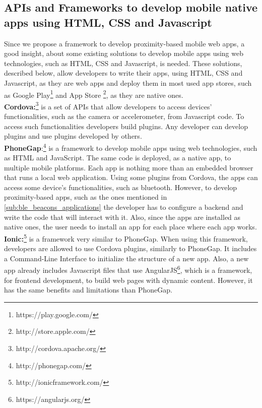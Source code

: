\subsection{APIs and Frameworks to develop mobile native apps 
using HTML, CSS and Javascript}
\label{sub:frameworks_web}
Since we propose a framework to develop proximity-based
mobile web apps, a good insight, about some existing
solutions to develop mobile apps using web technologies,
such as HTML, CSS and Javascript, is needed.
These solutions, described below, allow developers to
write their apps, using HTML, CSS and Javascript, as
they are web apps and deploy them in most used app
stores, such as 
Google Play\footnote{https://play.google.com/}
and
App Store \footnote{http://store.apple.com/},
as they are native ones.
\\
\textbf{Cordova:}\footnote{http://cordova.apache.org/}
is a set of APIs that allow developers to access
devices' functionalities, such as the camera or
accelerometer, from Javascript code.
To access such functionalities developers build plugins.
Any developer can develop plugins and use plugins
developed by others.
\\
\textbf{PhoneGap}:\footnote{http://phonegap.com/}
is a framework to develop mobile apps
using web technologies, such as HTML and JavaScript. The
same code is deployed, as a native app, to multiple mobile
platforms. Each app is nothing more than an embedded browser
that runs a local web application. 
Using some plugins from Cordova, the apps can access some
device's functionalities, such as bluetooth. 
However, to develop proximity-based apps, such as
the ones mentioned in 
\ref{sub:ble_beacons_applications}
the developer has to configure a backend and write the
code that will interact with it. Also, since the apps are
installed as native ones, the user needs to install
an app for each place where each app works.
\\
\textbf{Ionic:}\footnote{http://ionicframework.com/}
is a framework very similar to PhoneGap. When using
this framework, developers are allowed to use Cordova
plugins, similarly to PhoneGap. It includes a
Command-Line Interface to initialize the structure
of a new app. Also, a new app already includes Javascript
files that use 
AngularJS\footnote{https://angularjs.org/}, 
which is a framework, for frontend development,
to build web pages with dynamic content.
However, it has the same benefits and limitations
than PhoneGap.


